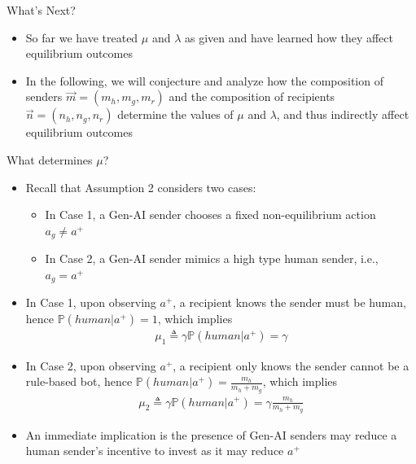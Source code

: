 \documentclass[9pt,aspectratio=1610]{beamer}
\begin{document}
\begin{frame}{What's Next?}
\begin{itemize}\setlength{\itemsep}{1em}
    \item So far we have treated $\mu$ and $\lambda$ as given and have learned how they affect equilibrium outcomes
    \item In the following, we will conjecture and analyze how the composition of senders $\vec{m} = (m_h,m_g,m_r)$ and the composition of recipients $\vec{n} = (n_h,n_g,n_r)$ determine the values of $\mu$ and $\lambda$, and thus indirectly affect equilibrium outcomes
\end{itemize}
\end{frame}

\begin{frame}{What determines $\mu$?}
\begin{itemize}\setlength{\itemsep}{1em}
    \item Recall that Assumption 2 considers two cases:
    \begin{itemize}
        \item In Case 1, a Gen-AI sender chooses a fixed non-equilibrium action $a_g\neq a^+$
        \item In Case 2, a Gen-AI sender mimics a high type human sender, i.e., $a_g= a^+$
    \end{itemize}
    \item In Case 1, upon observing $a^+$, a recipient knows the sender must be human, hence $\mathbb{P}(human|a^+)=1$, which implies 
    \begin{align*}
        \mu_1 \triangleq \gamma \mathbb{P}(human|a^+) = \gamma
    \end{align*}
    \item In Case 2, upon observing $a^+$, a recipient only knows the sender cannot be a rule-based bot, hence $\mathbb{P}(human|a^+)=\frac{m_h}{m_h+m_g}$, which implies 
    \begin{align*}
        \mu_2\triangleq \gamma \mathbb{P}(human|a^+) = \gamma \frac{m_h}{m_h+m_g}
    \end{align*}
    \item An immediate implication is the presence of Gen-AI senders may reduce a human sender's incentive to invest as it may reduce $a^+$ 
\end{itemize}
\end{frame}
\end{document}
